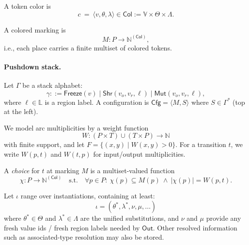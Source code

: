 \documentclass[sigconf]{acmart}
\begin{document}
A token color is
\begin{equation*}
    c ~=~ \langle v,\theta,\lambda\rangle \in \mathsf{Col} := \mathbb{V}\times\Theta\times\Lambda.
\end{equation*}

A colored marking is
\begin{equation*}
    M: P \to \mathbb{N}^{(\mathsf{Col})},
\end{equation*}
i.e., each place carries a finite multiset of colored tokens.

\paragraph{Pushdown stack.}
Let $\Gamma$ be a stack alphabet:
\begin{equation*}
    \gamma ::= \mathsf{Freeze}(v)\mid \mathsf{Shr}(v_o,v_r,\ell)\mid \mathsf{Mut}(v_o,v_r,\ell),
\end{equation*}
where $\ell\in\mathbb{L}$ is a region label.
A configuration is $\mathsf{Cfg}=\langle M,S\rangle$ where $S\in \Gamma^*$ (top at the left).

We model arc multiplicities by a weight function
\begin{equation*}
    W: (P\times T)\cup (T\times P)\to \mathbb{N}
\end{equation*}
with finite support, and let $F=\{(x,y)\mid W(x,y)>0\}$.
For a transition $t$, we write $W(p,t)$ and $W(t,p)$ for input/output multiplicities.

A \emph{choice} for $t$ at marking $M$ is a multiset-valued function
\begin{equation*}
    \chi:P\to \mathbb{N}^{(\mathsf{Col})}
    \quad\text{s.t.}\quad
    \forall p\in P:\ \chi(p)\subseteq M(p)\ \wedge\ |\chi(p)| = W(p,t).
\end{equation*}

Let $\iota$ range over instantiations, containing at least:
\begin{equation*}
    \iota=(\theta^{*},\lambda^{*},\nu,\mu,\dots)
\end{equation*}
where $\theta^{*}\in\Theta$ and $\lambda^{*}\in\Lambda$ are the unified substitutions, and $\nu$ and $\mu$ provide any fresh value ids / fresh region labels needed by $\mathsf{Out}$. Other resolved information such as associated-type resolution may also be stored.
\end{document}
